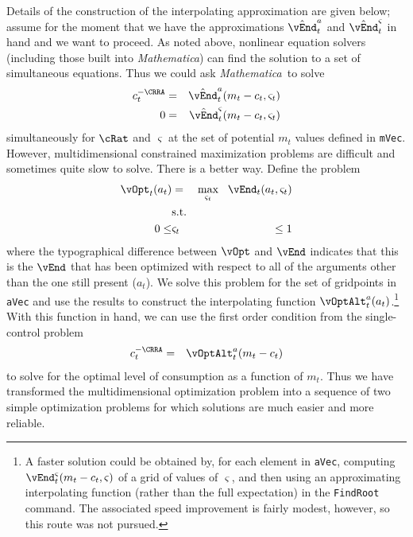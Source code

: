 \documentclass[titlepage]{\econtex}
\newcommand{\Mma}{\textit{Mathematica}}
\begin{document}
Details of the construction of the interpolating approximation are
given below; assume for the moment that we have the approximations
$\hat{\vEnd}_{t}^{{a}}$ and $\hat{\vEnd}_{t}^{\varsigma}$ in
hand and we want to proceed.  As noted above, nonlinear equation
solvers (including those built into {\Mma}) can find the
solution to a set of simultaneous equations.  Thus we could ask
{\Mma}~to solve
\begin{eqnarray}
  {c}_{t}^{-\CRRA} & = & \hat{\vEnd}^{a}_{t}({m}_{t}-{c}_{t},\varsigma_{t}) \label{eq:FOCwrtcMultContr}
  \\      0 & = & \hat{\vEnd}^{\varsigma}_{t}({m}_{t}-{c}_{t},\varsigma_{t}) \label{eq:FOCwrtw}
\end{eqnarray}
simultaneously for $\cRat$ and $\varsigma$ at the set of potential ${m}_{t}$ values defined in
\texttt{mVec}. However, multidimensional constrained
maximization problems are difficult and sometimes quite slow to
solve.  There is a better way.  Define the problem
\begin{eqnarray}
  \vOpt_{t}({a}_{t}) & = & \max_{\varsigma_{t}} ~~  \vEnd_{t}({a}_{t},\varsigma_{t})
  \\      & \text{s.t.} & \nonumber
  \\      0 \leq & \varsigma_{t} & \leq 1
\end{eqnarray}
where the typographical difference between $\vOpt$ and $\vEnd$
indicates that this is the $\vEnd$ that has been optimized with
respect to all of the arguments other than the one still present
(${a}_{t}$).  We solve this problem for the set of gridpoints in
\texttt{aVec} and use the results to construct the interpolating
function $\vOptAlt_{t}^{a}({a}_{t})$.\footnote{A faster solution
  could be obtained by, for each element in \texttt{aVec}, computing
  $\vEnd^{\varsigma}_{t}({m}_{t}-{c}_{t},\varsigma)$ of a grid of
  values of $\varsigma$, and then using an approximating interpolating
  function (rather than the full expectation) in the \texttt{FindRoot}
  command.  The associated speed improvement is fairly modest,
  however, so this route was not pursued.}  With this function in
hand, we can use the first order condition from the single-control
problem
\begin{eqnarray*}
  {c}_{t}^{-\CRRA} & = & \vOptAlt_{t}^{{a}}({m}_{t}-{c}_{t})
\end{eqnarray*}
to solve for the optimal level of consumption as a function of
${m}_{t}$.  Thus we have transformed the multidimensional optimization
problem into a sequence of two simple optimization problems for which
solutions are much easier and more reliable.
\end{document}
